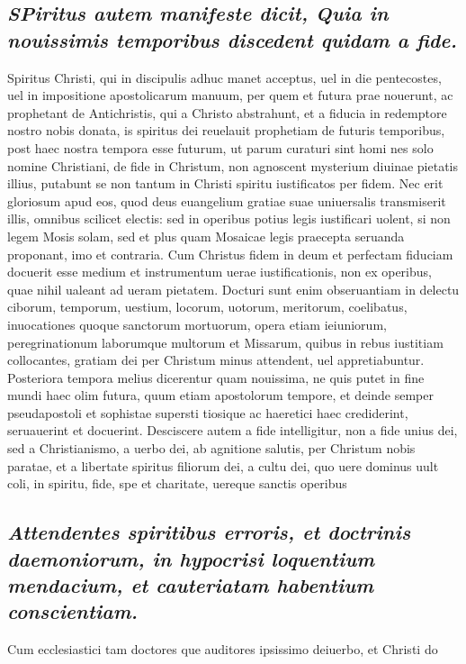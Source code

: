 \documentclass{article}
\begin{document}
\begin{pages}
\subsection*{\textit{\huge\textbf{S}\normalsize Piritus autem manifeste dicit, Quia in nouissimis temporibus discedent quidam a fide. }}\pstart Spiritus Christi, qui in discipulis adhuc manet acceptus, uel in die pentecostes, uel in impositione apostolicarum manuum, per quem et futura prae nouerunt, ac prophetant de Antichristis, qui a Christo abstrahunt, et a fiducia in redemptore nostro nobis donata, is spiritus dei reuelauit prophetiam de futuris temporibus, post haec nostra tempora esse futurum, ut parum curaturi sint homi nes solo nomine Christiani, de fide in Christum, non agnoscent mysterium diuinae pietatis illius, putabunt se non tantum in Christi spiritu iustificatos per fidem. Nec erit gloriosum apud eos, quod deus euangelium gratiae suae uniuersalis transmiserit illis, omnibus scilicet electis: sed in operibus potius legis iustificari uolent, si non legem Mosis solam, sed et plus quam Mosaicae legis praecepta seruanda proponant, imo et contraria. Cum Christus fidem in deum et perfectam fiduciam docuerit esse medium et instrumentum uerae iustificationis, non ex operibus, quae nihil ualeant ad ueram pietatem. Docturi sunt enim obseruantiam in delectu ciborum, temporum, uestium, locorum, uotorum, meritorum, coelibatus, inuocationes quoque sanctorum mortuorum, opera etiam ieiuniorum, peregrinationum laborumque multorum et Missarum, quibus in rebus iustitiam collocantes, gratiam dei per Christum minus attendent, uel appretiabuntur. Posteriora tempora melius dicerentur quam nouissima, ne quis putet in fine mundi haec olim futura, quum etiam apostolorum tempore, et deinde semper pseudapostoli et sophistae supersti tiosique ac haeretici haec crediderint, seruauerint et docuerint. Desciscere autem a fide intelligitur, non a fide unius dei, sed a Christianismo, a uerbo dei, ab agnitione salutis, per Christum nobis paratae, et a libertate spiritus filiorum dei, a cultu dei, quo uere dominus uult coli, in spiritu, fide, spe et charitate, uereque sanctis operibus   \pend
{}
{}
\subsection*{\textit{Attendentes spiritibus erroris, et doctrinis daemoniorum, in hypocrisi loquentium mendacium, et cauteriatam habentium conscientiam. }}\pstart Cum ecclesiastici tam doctores que auditores ipsissimo deiuerbo, et Christi do  \pend

\end{pages}
\end{document}

